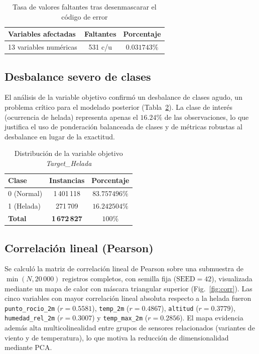 \begin{table}[H]
\centering
\caption{Tasa de valores faltantes tras desenmascarar el código de error}
\label{tab:missing}
\footnotesize
\begin{tabular}{lcc}
\toprule
\textbf{Variables afectadas} & \textbf{Faltantes} & \textbf{Porcentaje} \\
\midrule
13 variables numéricas & 531 c/u & $0.031743\%$ \\
\bottomrule
\end{tabular}
\end{table}

\subsection{Desbalance severo de clases}
El análisis de la variable objetivo confirmó un desbalance de clases agudo, un
problema crítico para el modelado posterior (Tabla~\ref{tab:imbalance}). La clase
de interés (ocurrencia de helada) representa apenas el $16.24\%$ de las
observaciones, lo que justifica el uso de ponderación balanceada de clases y de
métricas robustas al desbalance en lugar de la exactitud.

\begin{table}[H]
\centering
\caption{Distribución de la variable objetivo \emph{Target\_Helada}}
\label{tab:imbalance}
\footnotesize
\begin{tabular}{lcc}
\toprule
\textbf{Clase} & \textbf{Instancias} & \textbf{Porcentaje} \\
\midrule
0 (Normal) & 1\,401\,118 & $83.757496\%$ \\
1 (Helada) & 271\,709 & $16.242504\%$ \\
\midrule
\textbf{Total} & \textbf{1\,672\,827} & $100\%$ \\
\bottomrule
\end{tabular}
\end{table}

\subsection{Correlación lineal (Pearson)}
Se calculó la matriz de correlación lineal de Pearson sobre una submuestra de
$\min(N, 20\,000)$ registros completos, con semilla fija ($\text{SEED}=42$),
visualizada mediante un mapa de calor con máscara triangular superior
(Fig.~\ref{fig:corr}). Las cinco variables con mayor correlación lineal absoluta
respecto a la helada fueron \texttt{punto\_rocio\_2m} ($r=0.5581$),
\texttt{temp\_2m} ($r=0.4867$), \texttt{altitud} ($r=0.3779$),
\texttt{humedad\_rel\_2m} ($r=0.3007$) y \texttt{temp\_max\_2m} ($r=0.2856$). El
mapa evidencia además alta multicolinealidad entre grupos de sensores
relacionados (variantes de viento y de temperatura), lo que motiva la reducción
de dimensionalidad mediante PCA.

